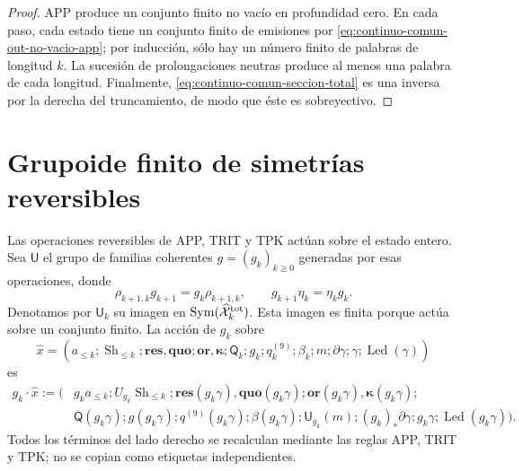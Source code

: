 \begin{proof}
APP produce un conjunto finito no vacío en profundidad cero.  En cada paso,
cada estado tiene un conjunto finito de emisiones por
\eqref{eq:continuo-comun-out-no-vacio-app}; por inducción, sólo hay un número
finito de palabras de longitud \(k\).  La sucesión de prolongaciones neutras
produce al menos una palabra de cada longitud.  Finalmente,
\eqref{eq:continuo-comun-seccion-total} es una inversa por la derecha del
truncamiento, de modo que éste es sobreyectivo.
\end{proof}

\section{Grupoide finito de simetrías reversibles}
\label{sec:continuo-comun-groupoide}

Las operaciones reversibles de APP, TRIT y TPK actúan sobre el estado entero.
Sea \(\mathsf U\) el grupo de familias coherentes
\(g=(g_k)_{k\geq0}\) generadas por esas operaciones, donde
\begin{equation}
\label{eq:continuo-comun-simetria-coherente}
 \rho_{k+1,k}g_{k+1}=g_k\rho_{k+1,k},
 \qquad
 g_{k+1}\eta_k=\eta_kg_k.
\end{equation}
Denotamos por \(\mathsf U_k\) su imagen en
\(\operatorname{Sym}(\widehat{\mathcal X}^{\rm tot}_k)\).  Esta imagen es
finita porque actúa sobre un conjunto finito.  La acción de \(g_k\) sobre
\begin{equation*}
 \widehat x=(a_{\leq k};\operatorname{Sh}_{\leq k};
 \mathbf{res},\mathbf{quo};\mathbf{or},\mathbf\kappa;
 \mathsf Q_k;g_k;q_k^{(9)};\beta_k;m;\partial\gamma;\gamma;
 \operatorname{Led}(\gamma))
\end{equation*}
es
\begin{equation}
\label{eq:continuo-comun-accion-reversible}
\begin{aligned}
 g_k\cdot\widehat x:=\bigl(&
 g_k a_{\leq k};
 U_{g_k}\operatorname{Sh}_{\leq k};
 \mathbf{res}(g_k\gamma),\mathbf{quo}(g_k\gamma);
 \mathbf{or}(g_k\gamma),\mathbf\kappa(g_k\gamma);\\
 &\mathsf Q(g_k\gamma);g(g_k\gamma);q^{(9)}(g_k\gamma);
 \beta(g_k\gamma);
 \mathsf U_{g_k}(m);
 (g_k)_*\partial\gamma;
 g_k\gamma;
 \operatorname{Led}(g_k\gamma)\bigr).
\end{aligned}
\end{equation}
Todos los términos del lado derecho se recalculan mediante las reglas APP,
TRIT y TPK; no se copian como etiquetas independientes.

